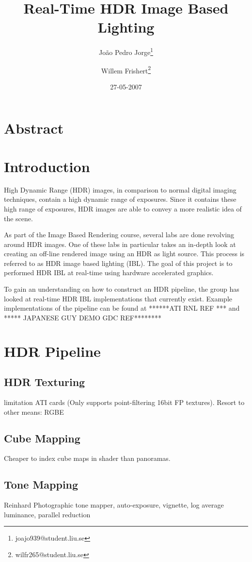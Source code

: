 \documentclass[twocolumn,8pt]{article}
\title{Real-Time HDR Image Based Lighting}
\author{Jo\~{a}o Pedro Jorge\thanks{joajo939@student.liu.se} \and Willem Frishert\thanks{wilfr265@student.liu.se}}
\date{27-05-2007}
\begin{document}
\small
\maketitle

\section{Abstract}

\section{Introduction}
High Dynamic Range (HDR) images, in comparison to normal digital imaging techniques, contain a high dynamic range of exposures. Since it contains these high range of exposures, HDR images are able to convey a more realistic idea of the scene. 

As part of the Image Based Rendering course, several labs are done revolving around HDR images. One of these labs in particular takes an in-depth look at creating an off-line rendered image using an HDR as light source. This process is referred to as HDR image based lighting (IBL). The goal of this project is to performed HDR IBL at real-time using hardware accelerated graphics.

To gain an understanding on how to construct an HDR pipeline, the group has looked at real-time HDR IBL implementations that currently exist. Example implementations of the pipeline can be found at ******ATI RNL REF *** and ***** JAPANESE GUY DEMO GDC REF********

\section{HDR Pipeline}

\subsection{HDR Texturing}
limitation ATI cards (Only supports point-filtering 16bit FP textures). Resort to other means: RGBE

\subsection{Cube Mapping}
Cheaper to index cube maps in shader than panoramas.

\subsection{Tone Mapping}
Reinhard Photographic tone mapper, auto-exposure, vignette, log average luminance, parallel reduction
\end{document}
